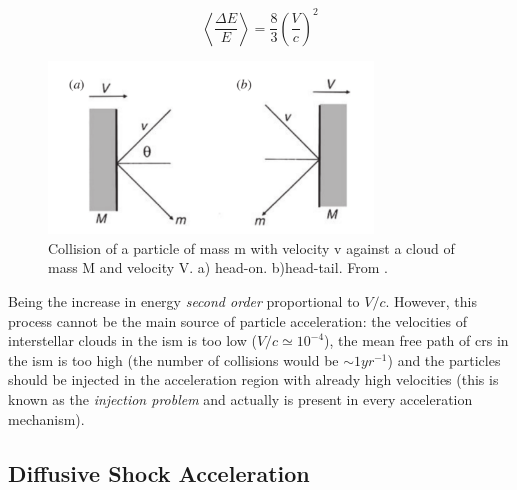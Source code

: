 \documentclass[main.tex]{subfiles}
\begin{document}
\begin{equation}
    \left< \frac{\Delta E}{E}\right> = \frac{8}{3}\left( \frac{V}{c}\right)^2
\end{equation}

\begin{figure}
    \centering
    \includegraphics[width=0.77\textwidth]{Pictures/secondorderfermiacc.pdf}
    \caption{Collision of a particle of mass m with velocity v against a cloud of mass M and velocity V. a) head-on. b)head-tail. From \cite{highenergyastrophy}.}
    \label{fig:fermiprocess}
\end{figure}

Being the increase in energy \textit{second order} proportional to $V/c$. However, this process cannot be the main source of particle acceleration: the velocities of interstellar clouds in the \gls{ism} is too low ($V/c \simeq 10^{-4}$), the mean free path of \glspl{cr} in the \gls{ism} is too high (the number of collisions would be $\sim 1yr^{-1}$) and the particles should be injected in the acceleration region with already high velocities (this is known as the \textit{injection problem} and actually is present in every acceleration mechanism).

\subsection{Diffusive Shock Acceleration}
\end{document}
